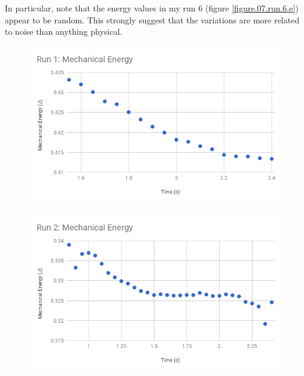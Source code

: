 In particular, note that the energy values in my run 6 (figure \ref{figure.07.run.6.e}) appear to be random. This strongly suggest that the variations are more related to noise than anything physical.
\begin{figure} \label{figure.07.run.1.e}
    \centering
    \includegraphics[scale=0.71]{image/07-mechanic/run-1-energy.png}
    \caption{}
\end{figure}
\begin{figure} \label{figure.07.run.2.e}
    \centering
    \includegraphics[scale=0.71]{image/07-mechanic/run-2-energy.png}
    \caption{}
\end{figure}
